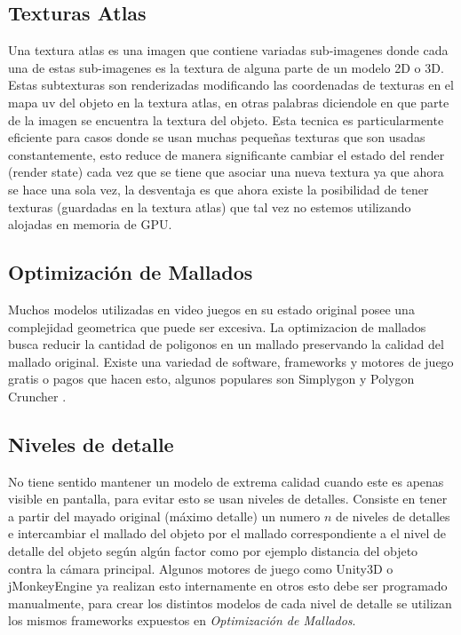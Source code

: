 \subsection{Texturas Atlas}
Una textura atlas es una imagen que contiene variadas sub-imagenes donde cada una de estas sub-imagenes es la textura de alguna parte de un modelo 2D o 3D. Estas subtexturas son renderizadas modificando las coordenadas de texturas en el mapa uv del objeto en la textura atlas, en otras palabras diciendole en que parte de la imagen se encuentra la textura del objeto. Esta tecnica es particularmente eficiente para casos donde se usan muchas pequeñas texturas que son usadas constantemente, esto reduce de manera significante cambiar el estado del render (render state) cada vez que se tiene que asociar una nueva textura ya que ahora se hace una sola vez, la desventaja es que ahora existe la posibilidad de tener texturas (guardadas en la textura atlas) que tal vez no estemos utilizando alojadas en memoria de GPU.
\subsection{Optimización de Mallados}
Muchos modelos utilizadas en video juegos en su estado original posee una complejidad geometrica que puede ser excesiva.  La optimizacion de mallados busca reducir la cantidad de poligonos en un mallado preservando la calidad del mallado original. Existe una variedad de software, frameworks y motores de juego gratis o pagos que hacen esto, algunos populares son Simplygon \cite{simplygon} y Polygon Cruncher \cite{polygon_sdk}.
\subsection{Niveles de detalle}
No tiene sentido mantener un modelo de extrema calidad cuando este es apenas visible en pantalla, para evitar esto se usan niveles de detalles. Consiste en tener a partir del mayado original (máximo detalle) un numero $n$ de niveles de detalles e intercambiar el mallado del objeto por el mallado correspondiente a el nivel de detalle del objeto según algún factor como por ejemplo distancia del objeto contra la cámara principal. Algunos motores de juego como Unity3D \cite{unity_lod} o jMonkeyEngine \cite{jmonkey} ya realizan esto internamente en otros esto debe ser programado manualmente, para crear los distintos modelos de cada nivel de detalle se utilizan los mismos frameworks expuestos en \emph{Optimización de Mallados}.
